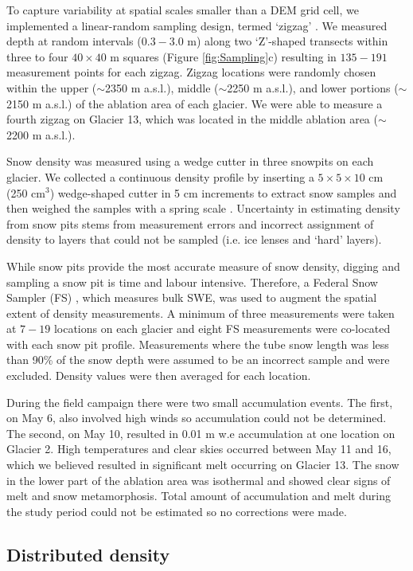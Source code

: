 \documentclass[review,oneside, letterpaper]{igs}
\begin{document}
To capture variability at spatial scales smaller than a DEM grid cell, we implemented a linear-random sampling design, termed `zigzag' \citep{Shea2010}. We measured depth at random intervals ($0.3 - 3.0$ m) along two `Z'-shaped transects within three to four $40\times40$ m squares (Figure \ref{fig:Sampling}c) resulting in $135-191$ measurement points for each zigzag. Zigzag locations were randomly chosen within the upper ($\sim$2350 m a.s.l.), middle ($\sim$2250 m a.s.l.), and lower portions ($\sim$2150 m a.s.l.) of the ablation area of each glacier. We were able to measure a fourth zigzag on Glacier 13, which was located in the middle ablation area ($\sim$2200 m a.s.l.).

Snow density was measured using a wedge cutter in three snowpits on each glacier. We collected a continuous density profile by inserting a $5\times5\times 10$ cm (250 cm$^3$) wedge-shaped cutter in 5 cm increments to extract snow samples and then weighed the samples with a spring scale \citep[e.g.][]{Gray1981,Fierz2009}. Uncertainty in estimating density from snow pits stems from measurement errors and incorrect assignment of density to layers that could not be sampled (i.e. ice lenses and `hard' layers). 

While snow pits provide the most accurate measure of snow density, digging and sampling a snow pit is time and labour intensive. Therefore, a Federal Snow Sampler (FS) \citep{Clyde1932}, which measures bulk SWE, was used to augment the spatial extent of density measurements. A minimum of three measurements were taken at $7-19$ locations on each glacier and eight FS measurements were co-located with each snow pit profile. Measurements where the tube snow length was less than 90\% of the snow depth were assumed to be an incorrect sample and were excluded. Density values were then averaged for each location. 

During the field campaign there were two small accumulation events. The first, on May 6, also involved high winds so accumulation could not be determined. The second, on May 10, resulted in 0.01 m w.e accumulation at one location on Glacier 2. High temperatures and clear skies occurred between May 11 and 16, which we believed resulted in significant melt occurring on Glacier 13. The snow in the lower part of the ablation area was isothermal and showed clear signs of melt and snow metamorphosis. Total amount of accumulation and melt during the study period could not be estimated so no corrections were made. 

\subsection{Distributed density}
\end{document}
